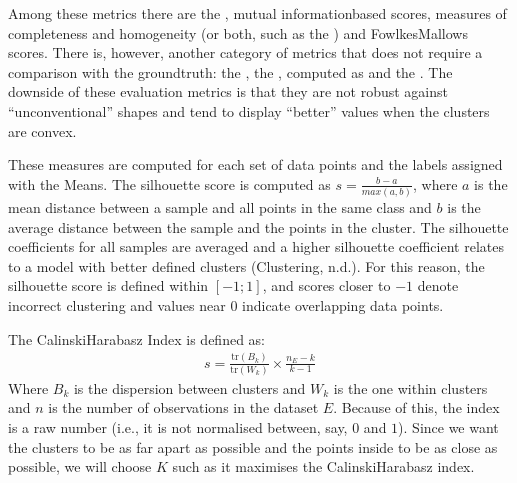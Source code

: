 \documentclass[letterpaper,10pt,english]{jupyterBook}
\begin{document}
\sphinxAtStartPar
Among these metrics there are the , mutual information\sphinxhyphen{}based scores, measures of completeness and homogeneity (or both, such as the ) and Fowlkes\sphinxhyphen{}Mallows scores. There is, however, another category of metrics that does not require a comparison with the ground\sphinxhyphen{}truth: the , the , computed as  and  the . The downside of these evaluation metrics is that they are not robust against “unconventional” shapes and tend to display “better” values when the clusters are convex.

\sphinxAtStartPar
These measures are computed for each set of data points and the labels assigned with the \sphinxhyphen{}Means. The silhouette score is computed as \(s = \frac{b - a}{max(a, b)}\), where \(a\) is the mean distance between a sample and all points in the same class and \(b\) is the average distance between the sample and the points in the  cluster. The silhouette coefficients for all samples are averaged and a higher silhouette coefficient relates to a model with better defined clusters (Clustering, n.d.). For this reason, the silhouette score is defined within \([-1;1]\), and scores closer to \(-1\) denote incorrect clustering and values near \(0\) indicate overlapping data points.

\sphinxAtStartPar
The Calinski\sphinxhyphen{}Harabasz Index is defined as:
\begin{equation*}
\begin{split}
s = \frac{\mathrm{tr}(B_k)}{\mathrm{tr}(W_k)} \times \frac{n_E - k}{k - 1}
\end{split}
\end{equation*}
\sphinxAtStartPar
Where \(B_k\) is the dispersion between clusters and \(W_k\) is the one within clusters and \(n\) is the number of observations in the dataset \(E\). Because of this, the index is a raw number (i.e., it is not normalised between, say, \(0\) and \(1\)). Since we want the clusters to be as far apart as possible and the points inside to be as close as possible, we will choose \(K\) such as it maximises the Calinski\sphinxhyphen{}Harabasz index.
\end{document}
